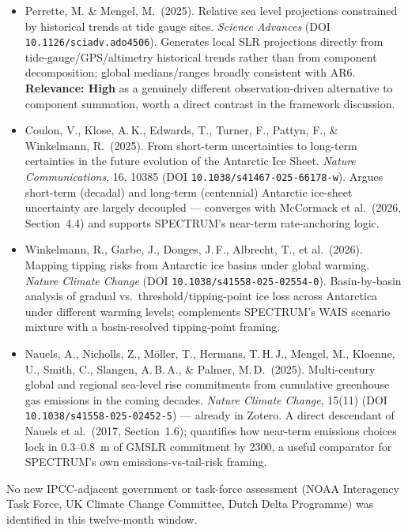 \documentclass[11pt]{article}
\begin{document}
\begin{itemize}[leftmargin=*]
\item Perrette, M. \& Mengel, M.\ (2025). Relative sea level projections
constrained by historical trends at tide gauge sites. \textit{Science
Advances} (DOI \texttt{10.1126/sciadv.ado4506}). Generates local SLR
projections directly from tide-gauge/GPS/altimetry historical trends rather
than from component decomposition; global medians/ranges broadly consistent
with AR6. \textbf{Relevance: High} as a genuinely different observation-driven
alternative to component summation, worth a direct contrast in the framework
discussion.
\item Coulon, V., Klose, A.\,K., Edwards, T., Turner, F., Pattyn, F., \&
Winkelmann, R.\ (2025). From short-term uncertainties to long-term
certainties in the future evolution of the Antarctic Ice Sheet.
\textit{Nature Communications}, 16, 10385 (DOI
\texttt{10.1038/s41467-025-66178-w}). Argues short-term (decadal) and
long-term (centennial) Antarctic ice-sheet uncertainty are largely
decoupled --- converges with McCormack et al.\ (2026, Section~4.4) and
supports SPECTRUM's near-term rate-anchoring logic.
\item Winkelmann, R., Garbe, J., Donges, J.\,F., Albrecht, T., et al.\
(2026). Mapping tipping risks from Antarctic ice basins under global
warming. \textit{Nature Climate Change} (DOI
\texttt{10.1038/s41558-025-02554-0}). Basin-by-basin analysis of gradual
vs.\ threshold/tipping-point ice loss across Antarctica under different
warming levels; complements SPECTRUM's WAIS scenario mixture with a
basin-resolved tipping-point framing.
\item Nauels, A., Nicholls, Z., Möller, T., Hermans, T.\,H.\,J.,
Mengel, M., Kloenne, U., Smith, C., Slangen, A.\,B.\,A., \&
Palmer, M.\,D.\ (2025). Multi-century global and regional sea-level rise
commitments from cumulative greenhouse gas emissions in the coming decades.
\textit{Nature Climate Change}, 15(11) (DOI
\texttt{10.1038/s41558-025-02452-5}) --- already in Zotero. A direct
descendant of Nauels et al.\ (2017, Section~1.6); quantifies how near-term
emissions choices lock in 0.3--0.8~m of GMSLR commitment by 2300, a useful
comparator for SPECTRUM's own emissions-vs-tail-risk framing.
\end{itemize}

\noindent No new IPCC-adjacent government or task-force assessment (NOAA
Interagency Task Force, UK Climate Change Committee, Dutch Delta Programme)
was identified in this twelve-month window.
\end{document}
